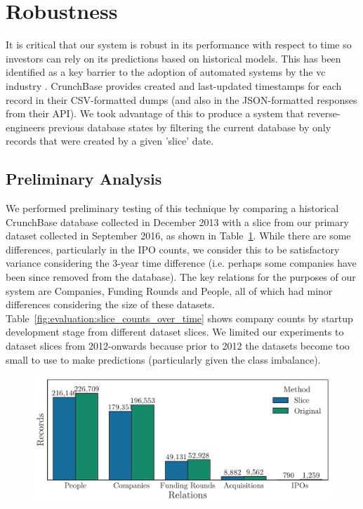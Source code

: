 \documentclass[../thesis/thesis.tex]{subfiles}
\begin{document}
\begin{table}[!htb]
    \centering
    \scalebox{0.9}{}
    \caption[System time profile]{}
    \label{fig:evaluation:time_profile}
\end{table}

\section{Robustness}

It is critical that our system is robust in its performance with respect to time so investors can rely on its predictions based on historical models. This has been identified as a key barrier to the adoption of automated systems by the \gls{vc} industry \cite{stone2014}. CrunchBase provides created and last-updated timestamps for each record in their CSV-formatted dumps (and also in the JSON-formatted responses from their API). We took advantage of this to produce a system that reverse-engineers previous database states by filtering the current database by only records that were created by a given 'slice' date.

\subsection{Preliminary Analysis}

We performed preliminary testing of this technique by comparing a historical CrunchBase database collected in December 2013 with a slice from our primary dataset collected in September 2016, as shown in Table~\ref{fig:evaluation:2013_slice_comparison}. While there are some differences, particularly in the IPO counts, we consider this to be satisfactory variance considering the 3-year time difference (i.e. perhaps some companies have been since removed from the database). The key relations for the purposes of our system are Companies, Funding Rounds and People, all of which had minor differences considering the size of these datasets. Table~\ref{fig:evaluation:slice_counts_over_time} shows company counts by startup development stage from different dataset slices. We limited our experiments to dataset slices from 2012-onwards because prior to 2012 the datasets become too small to use to make predictions (particularly given the class imbalance).

\begin{figure}[!htb]
    \centering
    \includegraphics[width=\textwidth]{../figures/evaluation/2013_slice_comparison}
    \caption[Dataset slice compared with original dataset]{} %
    \label{fig:evaluation:2013_slice_comparison}
\end{figure}
\end{document}

